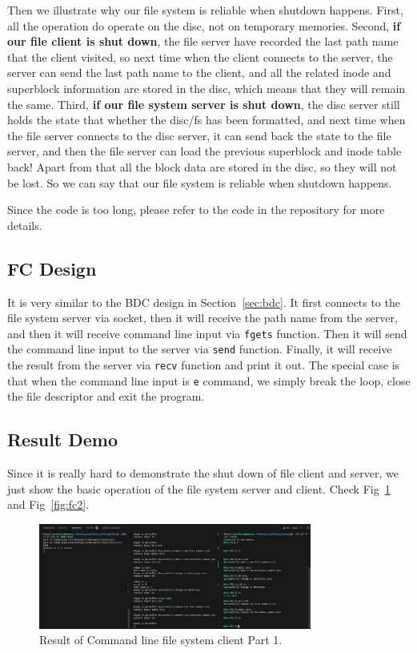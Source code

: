 Then we illustrate why our file system is reliable when shutdown happens. First, all the operation do operate on the disc, not on temporary memories.
Second, \textbf{if our file client is shut down}, the file server have recorded the last path name that the client visited, so next time when the client connects to the server, the server can send the last path name to the client, and all the related inode and superblock information are stored in the disc, which means that
they will remain the same. Third, \textbf{if our file system server is shut down}, the disc server still holds the state that whether the disc/fs has been formatted, 
and next time when the file server connects to the disc server, it can send back the state to the file server, and then the file server can load the previous superblock and inode table back! Apart from that all the block data are stored in the disc, so they will not be lost. So we can say that our file system is reliable when shutdown happens.

Since the code is too long, please refer to the code in the repository for more details.

\subsection{FC Design}
It is very similar to the BDC design in Section~\ref{sec:bdc}. It first connects to the file system server via socket,
then it will receive the path name from the server, and then it will receive command line input via \texttt{fgets} function. Then it will send the command line input to the server via \texttt{send} function.
Finally, it will receive the result from the server via \texttt{recv} function and print it out. The special case is that when the command line input is \texttt{e} command, we simply break the loop, close the file descriptor and exit the program.

\subsection{Result Demo}
Since it is really hard to demonstrate the shut down of file client and server, we just show the basic operation of the file system server and client. Check Fig~\ref{fig:fc1} and Fig~\ref{fig:fc2}.

\begin{figure}[!h]
    \centering
    \includegraphics[width=0.8\textwidth]{fig/fc1.png}
    \caption{Result of Command line file system client Part 1.}
    \label{fig:fc1}
\end{figure}

